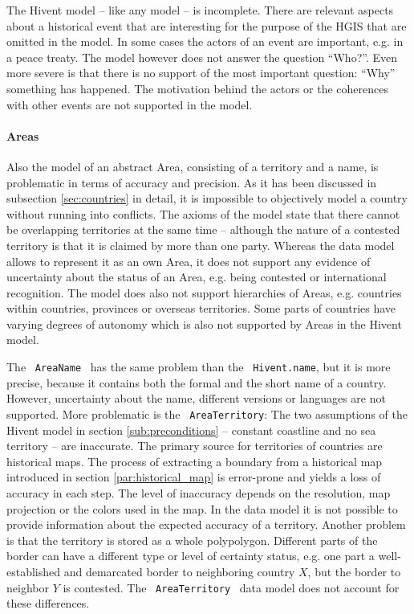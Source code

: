 The Hivent model -- like any model -- is incomplete. There are relevant aspects about a historical event that are interesting for the purpose of the HGIS that are omitted in the model. In some cases the actors of an event are important, e.g. in a peace treaty. The model however does not answer the question ``Who?''. Even more severe is that there is no support of the most important question: ``Why'' something has happened. The motivation behind the actors or the coherences with other events are not supported in the model.


\paragraph{Areas} %
\label{par:evaluation_areas}

Also the model of an abstract Area, consisting of a territory and a name, is problematic in terms of accuracy and precision. As it has been discussed in subsection \ref{sec:countries} in detail, it is impossible to objectively model a country without running into conflicts.
The axioms of the model state that there cannot be overlapping territories at the same time -- although the nature of a contested territory is that it is claimed by more than one party. Whereas the data model allows to represent it as an own Area, it does not support any evidence of uncertainty about the status of an Area, e.g. being contested or international recognition.
The model does also not support hierarchies of Areas, e.g. countries within countries, provinces or overseas territories. Some parts of countries have varying degrees of autonomy which is also not supported by Areas in the Hivent model.

The ~\texttt{AreaName}~ has the same problem than the ~\texttt{Hivent.name}, but it is more precise, because it contains both the formal and the short name of a country. However, uncertainty about the name, different versions or languages are not supported. More problematic is the ~\texttt{AreaTerritory}: The two assumptions of the Hivent model in section \ref{sub:preconditions} -- constant coastline and no sea territory -- are inaccurate. The primary source for territories of countries are historical maps. The process of extracting a boundary from a historical map introduced in section \ref{par:historical_map} is error-prone and yields a loss of accuracy in each step. The level of inaccuracy depends on the resolution, map projection or the colors used in the map. In the data model it is not possible to provide information about the expected accuracy of a territory. Another problem is that the territory is stored as a whole polypolygon. Different parts of the border can have a different type or level of certainty status, e.g. one part a well-established and demarcated border to neighboring country $X$, but the border to neighbor $Y$ is contested. The ~\texttt{AreaTerritory}~ data model does not account for these differences.

